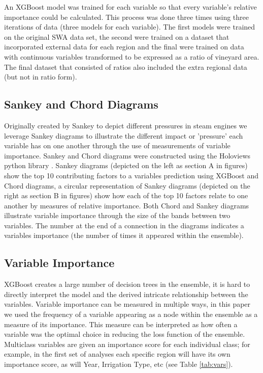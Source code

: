 \documentclass[review,12pt,authoryear]{elsarticle}
\begin{document}
\begin{linenumbers}
\par
An XGBoost model was trained for each variable so that every variable's relative importance could be calculated. This process was done three times using three iterations of data (three models for each variable). The first models were trained on the original SWA data set, the second were trained on a dataset that incorporated external data for each region and the final were trained on data with continuous variables transformed to be expressed as a ratio of vineyard area. The final dataset that consisted of ratios also included the extra regional data (but not in ratio form).

\subsection{Sankey and Chord Diagrams}

Originally created by Sankey to depict different pressures in steam engines \citep{7536189} we leverage Sankey diagrams to illustrate the different impact or 'pressure' each variable has on one another through the use of measurements of variable importance. Sankey and Chord diagrams were constructed using the Holoviews python library \citep{rudigerHolovizHoloviewsVersion2020}. Sankey diagrams (depicted on the left as section A in figures) show the top 10 contributing factors to a variables prediction using XGBoost and Chord diagrams, a circular representation of Sankey diagrams (depicted on the right as section B in figures) show how each of the top 10 factors relate to one another by measures of relative importance. Both Chord and Sankey diagrams illustrate variable importance through the size of the bands between two variables. The number at the end of a connection in the diagrams indicates a variables importance (the number of times it appeared within the ensemble).

\subsection{Variable Importance}\label{sec:importance}

XGBoost creates a large number of decision trees in the ensemble, it is hard to directly interpret the model and the derived intricate relationship between the variables. Variable importance can be measured in multiple ways, in this paper we used the frequency of a variable appearing as a node within the ensemble as a measure of its importance. This measure can be interpreted as how often a variable was the optimal choice in reducing the loss function of the ensemble. Multiclass variables are given an importance score for each individual class; for example, in the first set of analyses each specific region will have its own importance score, as will Year, Irrigation Type, etc (see Table \ref{tab:vars}).


\end{linenumbers}
\end{document}
